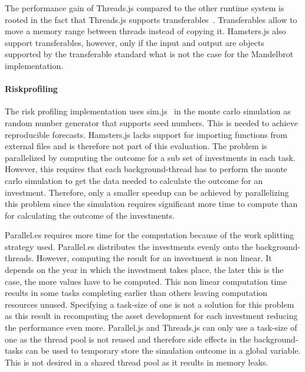 The performance gain of Threads.js compared to the other runtime system is rooted in the fact that Threads.js supports transferables~\cite[Section 2.7.4]{w3cHtml5}. Transferables allow to move a memory range between threads instead of copying it. Hamsters.js also support transferables, however, only if the input and output are objects supported by the transferable standard what is not the case for the Mandelbrot implementation.

\paragraph{Riskprofiling}
The risk profiling implementation uses sim.js~\cite{simjs} in the monte carlo simulation as random number generator that supports seed numbers. This is needed to achieve reproducible forecasts. Hamsters.js lacks support for importing functions from external files and is therefore not part of this evaluation. The problem is parallelized by computing the outcome for a sub set of investments in each task. However, this requires that each background-thread has to perform the monte carlo simulation to get the data needed to calculate the outcome for an investment. Therefore, only a smaller speedup can be achieved by parallelizing this problem since the simulation requires significant more time to compute than for calculating the outcome of the investments. 

Parallel.es requires more time for the computation because of the work splitting strategy used. Parallel.es distributes the investments evenly onto the background-threads. However, computing the result for an investment is non linear. It depends on the year in which the investment takes place, the later this is the case, the more values have to be computed. This non linear computation time results in some tasks completing earlier than others leaving computation resources unused. Specifying a task-size of one is not a solution for this problem as this result in recomputing the asset development for each investment reducing the performance even more. Parallel.js and Threads.js can only use a task-size of one as the thread pool is not reused and therefore side effects in the background-tasks can be used to temporary store the simulation outcome in a global variable. This is not desired in a shared thread pool as it results in memory leaks.
